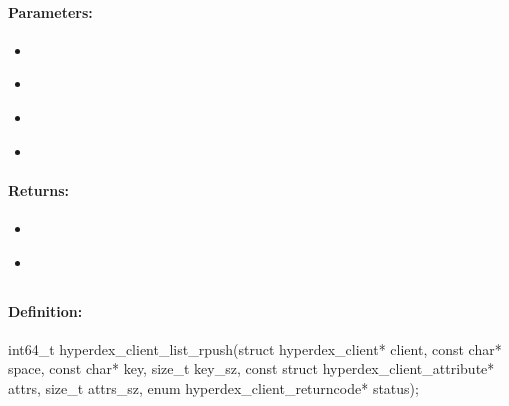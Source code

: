\paragraph{Parameters:}
\begin{itemize}[noitemsep]
\item {}\\

\item {}\\

\item {}\\

\item {}\\

\end{itemize}

\paragraph{Returns:}
\begin{itemize}[noitemsep]
\item {}\\

\item {}\\

\end{itemize}

\pagebreak
\subsection{}
\label{api:c:list_rpush}


\paragraph{Definition:}
\begin{ccode}
int64_t hyperdex_client_list_rpush(struct hyperdex_client* client,
        const char* space,
        const char* key, size_t key_sz,
        const struct hyperdex_client_attribute* attrs, size_t attrs_sz,
        enum hyperdex_client_returncode* status);
\end{ccode}

